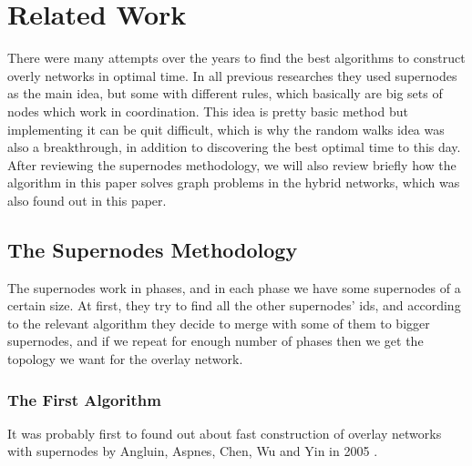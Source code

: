 \documentclass[11pt]{article}
\begin{document}
\section{Related Work}
There were many attempts over the years to find the best algorithms to construct overly networks in optimal time. In all previous researches they used supernodes as the main idea, but some with different rules, which basically are big sets of nodes which work in coordination. This idea is pretty basic method but implementing it can be quit difficult, which is why the random walks idea was also a breakthrough, in addition to discovering the best optimal time to this day. After reviewing the supernodes methodology, we will also review briefly how the algorithm in this paper solves graph problems in the hybrid networks, which was also found out in this paper.

\subsection{The Supernodes Methodology}
The supernodes work in phases, and in each phase we have some supernodes of a certain size. At first, they try to find all the other supernodes' ids, and according to the relevant algorithm they decide to merge with some of them to bigger supernodes, and if we repeat for enough number of phases then we get the topology we want for the overlay network. 

\subsubsection{The First Algorithm}
It was probably first to found out about fast construction of overlay networks with supernodes by Angluin, Aspnes, Chen, Wu and Yin in 2005 \cite{ref2}.



\end{document}
